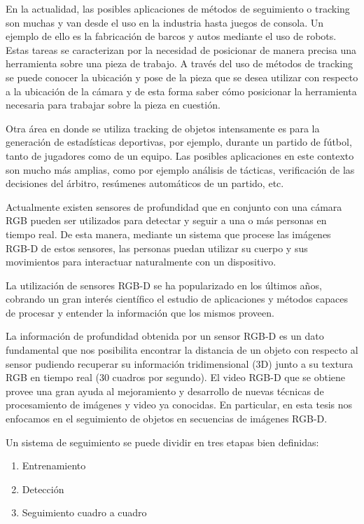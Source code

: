 
En la actualidad, las posibles aplicaciones de métodos de seguimiento o tracking son muchas y van desde el uso en la industria hasta juegos de consola. Un ejemplo de ello es la fabricación de barcos y autos mediante el uso de robots. Estas tareas se caracterizan por la necesidad de posicionar de manera precisa una herramienta sobre una pieza de trabajo. A través del uso de métodos de tracking se puede conocer la ubicación y pose de la pieza que se desea utilizar con respecto a la ubicación de la cámara y de esta forma saber cómo posicionar la herramienta necesaria para trabajar sobre la pieza en cuestión.

Otra área en donde se utiliza tracking de objetos intensamente es para la generación de estadísticas deportivas, por ejemplo, durante un partido de fútbol, tanto de jugadores como de un equipo. Las posibles aplicaciones en este contexto son mucho más amplias, como por ejemplo análisis de tácticas, verificación de las decisiones del árbitro, resúmenes automáticos de un partido, etc.

Actualmente existen sensores de profundidad que en conjunto con una cámara RGB pueden ser utilizados para detectar y seguir a una o más personas en tiempo real. De esta manera, mediante un sistema que procese las imágenes RGB-D de estos sensores, las personas puedan utilizar su cuerpo y sus movimientos para interactuar naturalmente con un dispositivo.

La utilización de sensores RGB-D se ha popularizado en los últimos años, cobrando un gran interés científico el estudio de aplicaciones y métodos capaces de procesar y entender la información que los mismos proveen.

La información de profundidad obtenida por un sensor RGB-D es un dato fundamental que nos posibilita encontrar la distancia de un objeto con respecto al sensor pudiendo recuperar su información tridimensional (3D) junto a su textura RGB en tiempo real (30 cuadros por segundo). El video RGB-D que se obtiene provee una gran ayuda al mejoramiento y desarrollo de nuevas técnicas de procesamiento de imágenes y video ya conocidas. En particular, en esta tesis nos enfocamos en el seguimiento de objetos en secuencias de imágenes RGB-D.

Un sistema de seguimiento se puede dividir en tres etapas bien definidas:
\begin{enumerate}
 \item Entrenamiento
 \item Detección
 \item Seguimiento cuadro a cuadro
\end{enumerate}

